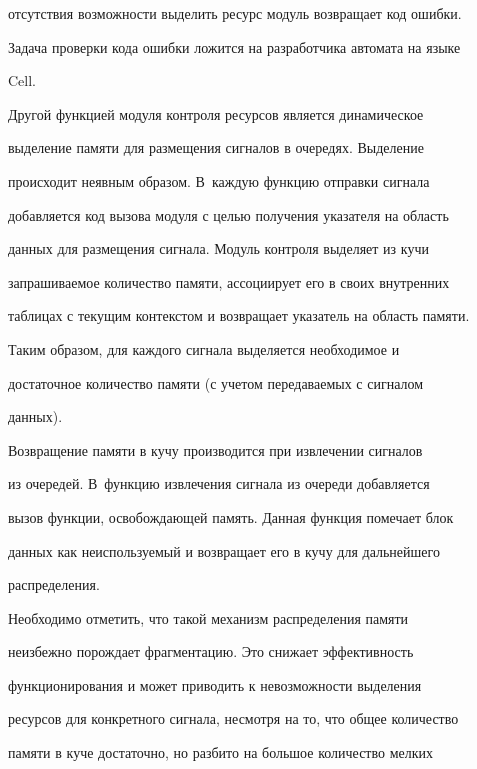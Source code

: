 отсутствия возможности выделить ресурс модуль возвращает код ошибки. 


Задача проверки кода ошибки ложится на разработчика автомата на языке 


Cell.


      


      Другой функцией модуля контроля ресурсов является динамическое 


выделение памяти для размещения сигналов в очередях. Выделение 


происходит неявным образом. В~каждую функцию отправки сигнала 


добавляется код вызова модуля с целью получения указателя на область 


данных для размещения сигнала. Модуль контроля выделяет из кучи 


запрашиваемое количество памяти, ассоциирует его в своих внутренних 


таблицах с текущим контекстом и возвращает указатель на область памяти. 


Таким образом, для каждого сигнала выделяется необходимое и 


достаточное количество памяти (с учетом передаваемых с сигналом 


данных). 


      


      Возвращение памяти в кучу производится при извлечении сигналов 


из очередей. В~функцию извлечения сигнала из очереди добавляется 


вызов функции, освобождающей память. Данная функция помечает блок 


данных как неиспользуемый и возвращает его в кучу для дальнейшего 


распределения.


      


      Необходимо отметить, что такой механизм распределения памяти 


неизбежно порождает фрагментацию. Это снижает эффективность 


функционирования и может приводить к невозможности выделения 


ресурсов для конкретного сигнала, несмотря на то, что общее количество 


памяти в куче достаточно, но разбито на большое количество мелких 


